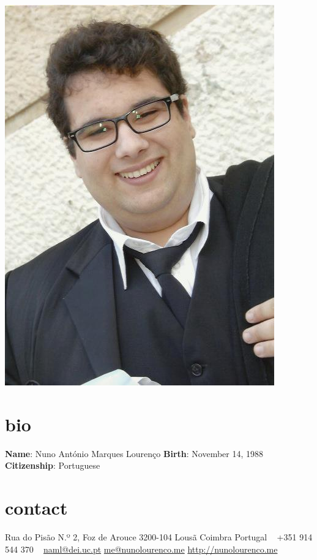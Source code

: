 \documentclass[]{friggeri-cv} %
\begin{document}


\begin{aside} %
\includegraphics[scale=0.2]{me.jpeg}
\section{bio}
\textbf{Name}: Nuno António Marques Lourenço
\textbf{Birth}: November 14, 1988
\textbf{Citizenship}: Portuguese
\section{contact}
Rua do Pisão N.º 2, Foz de Arouce
3200-104 Lousã
Coimbra
Portugal
~
+351 914 544 370
~
\href{mailto:naml@dei.uc.pt}{naml@dei.uc.pt}
\href{mailto:me@nunolourenco.me}{me@nunolourenco.me}
\href{http://nunolourenco.me}{http://nunolourenco.me}

\end{aside}
\end{document}
